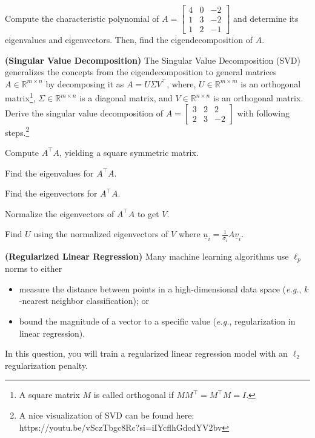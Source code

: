\documentclass{article}
\theoremstyle{definition}
\begin{document}
\begin{question}[start=0]
\begin{question}
		Compute the characteristic polynomial of $A = \begin{bmatrix}
			4 & 0 & -2 \\
			1 & 3 & -2 \\
			1 & 2 & -1
		\end{bmatrix}$ and determine its eigenvalues and eigenvectors. Then, find the eigendecomposition of $A$.
		\item \textbf{(Singular Value Decomposition)} The Singular Value Decomposition (SVD) generalizes the concepts from the eigendecomposition to general matrices $A \in \mathbb{R}^{m \times n}$ by decomposing it as $A = U \Sigma V^\top$, where, $U \in \mathbb{R}^{m \times m}$ is an orthogonal matrix\footnote{A square matrix $M$ is called orthogonal if $MM^\top = M^\top M = I$.}, $\Sigma \in \mathbb{R}^{m \times n}$ is a diagonal matrix, and $V \in \mathbb{R}^{n \times n}$ is an orthogonal matrix.\\
		Derive the singular value decomposition of $A = \begin{bmatrix}
			3 & 2 & 2\\
			2 & 3 & -2
		\end{bmatrix}$ with following steps.\footnote{A nice visualization of SVD can be found here: https://youtu.be/vSczTbgc8Rc?si=iIYcflhGdcdYV2bv}
		\begin{question}
			\item Compute $A^\top A$, yielding a square symmetric matrix.
			\item Find the eigenvalues for $A^\top A$.
			\item Find the eigenvectors for $A^\top A$.
			\item Normalize the eigenvectors of $A^\top A$ to get $V$.
			\item Find $U$ using the normalized eigenvectors of $V$ where $\underline{u}_i = \frac{1}{\sigma_i} A \underline{v}_i$.
		\end{question}
	\end{question}
	\item \textbf{(Regularized Linear Regression)} Many machine learning algorithms use $\ell_p$ norms to either
	\begin{itemize}
		\item measure the distance between points in a high-dimensional data space (\textit{e.g.}, $k$-nearest neighbor classification); or
		\item bound the magnitude of a vector to a specific value (\textit{e.g.}, regularization in linear regression).
	\end{itemize}
	In this question, you will train a regularized linear regression model with an $\ell_2$ regularization penalty.\\
	

\end{question}
\end{document}
